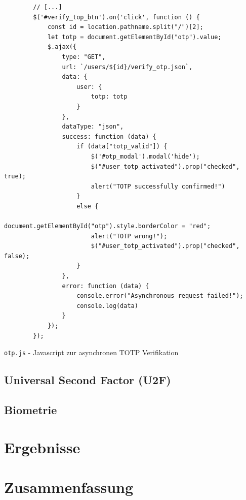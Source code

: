 \documentclass[11pt,a4paper,ngerman]{scrreprt}
\begin{document}
\begin{listing}[htpb]
    \begin{verbatim}
        // [...]
        $('#verify_top_btn').on('click', function () {
            const id = location.pathname.split("/")[2];
            let totp = document.getElementById("otp").value;
            $.ajax({
                type: "GET",
                url: `/users/${id}/verify_otp.json`,
                data: {
                    user: {
                        totp: totp
                    }
                },
                dataType: "json",
                success: function (data) {
                    if (data["totp_valid"]) {
                        $('#otp_modal').modal('hide');
                        $("#user_totp_activated").prop("checked", true);
                        alert("TOTP successfully confirmed!")
                    }
                    else {
                        document.getElementById("otp").style.borderColor = "red";
                        alert("TOTP wrong!");
                        $("#user_totp_activated").prop("checked", false);
                    }
                },
                error: function (data) {
                    console.error("Asynchronous request failed!");
                    console.log(data)
                }
            });
        });
    \end{verbatim}
    \caption{\texttt{otp.js} - Javascript zur asynchronen TOTP Verifikation}
    \label{lst:otp.js}
\end{listing}
\clearpage
\section{Universal Second Factor (U2F)}
\section{Biometrie}

\chapter{Ergebnisse}

\chapter{Zusammenfassung}


\end{document}
